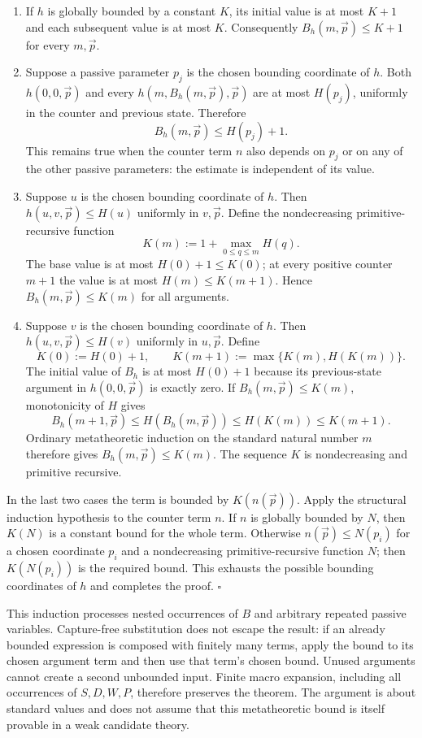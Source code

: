 \begin{enumerate}
\item If $h$ is globally bounded by a constant $K$, its initial value
is at most $K+1$ and each subsequent value is at most $K$.
Consequently $B_h(m,\vec p)\le K+1$ for every $m,\vec p$.

\item Suppose a passive parameter $p_j$ is the chosen bounding coordinate
of $h$.  Both $h(0,0,\vec p)$ and every
$h(m,B_h(m,\vec p),\vec p)$ are at most $H(p_j)$, uniformly in the
counter and previous state.  Therefore
\[
                 B_h(m,\vec p)\le H(p_j)+1.
\]
This remains true when the counter term $n$ also depends on $p_j$ or
on any of the other passive parameters: the estimate is independent
of its value.

\item Suppose $u$ is the chosen bounding coordinate of $h$.  Then
$h(u,v,\vec p)\le H(u)$ uniformly in $v,\vec p$.  Define the
nondecreasing primitive-recursive function
\[
                 K(m):=1+\max_{0\le q\le m}H(q).
\]
The base value is at most $H(0)+1\le K(0)$; at every positive
counter $m+1$ the value is at most $H(m)\le K(m+1)$.
Hence $B_h(m,\vec p)\le K(m)$ for all arguments.

\item Suppose $v$ is the chosen bounding coordinate of $h$.  Then
$h(u,v,\vec p)\le H(v)$ uniformly in $u,\vec p$.  Define
\[
 K(0):=H(0)+1,\qquad
 K(m+1):=\max\{K(m),H(K(m))\}.
\]
The initial value of $B_h$ is at most $H(0)+1$ because its
previous-state argument in $h(0,0,\vec p)$ is exactly zero.
If $B_h(m,\vec p)\le K(m)$, monotonicity of $H$ gives
\[
 B_h(m+1,\vec p)
 \le H(B_h(m,\vec p))
 \le H(K(m))\le K(m+1).
\]
Ordinary metatheoretic induction on the standard natural number $m$
therefore gives $B_h(m,\vec p)\le K(m)$.  The sequence $K$ is
nondecreasing and primitive recursive.
\end{enumerate}

In the last two cases the term is bounded by $K(n(\vec p))$.
Apply the structural induction hypothesis to the counter term $n$.
If $n$ is globally bounded by $N$, then $K(N)$ is a constant bound
for the whole term.  Otherwise $n(\vec p)\le N(p_i)$ for a chosen
coordinate $p_i$ and a nondecreasing primitive-recursive function $N$;
then $K(N(p_i))$ is the required bound.  This exhausts the possible
bounding coordinates of $h$ and completes the proof.
\hfill$\square$

This induction processes nested occurrences of $B$ and arbitrary repeated
passive variables.  Capture-free substitution does not escape the result:
if an already bounded expression is composed with finitely many terms,
apply the bound to its chosen argument term and then use that term's
chosen bound.  Unused arguments cannot create a second unbounded input.
Finite macro expansion, including all occurrences of $S,D,W,P$, therefore
preserves the theorem.  The argument is about standard values and does
not assume that this metatheoretic bound is itself provable in a weak
candidate theory.

